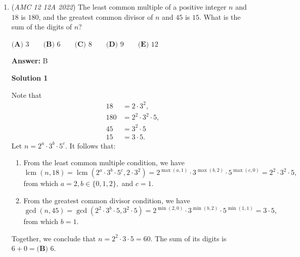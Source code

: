 \begin{enumerate}
 By substitution, we get this list
 \begin{align*} 2&\times 7 \\ 5&\times 6 \\ 2&\times 3 \\ 1&\times 6 \\ \end{align*}
(This also tells us that the diagram is not drawn to scale.)

 Notice how the only dimension not used in the list was $2\times 4$ and that corresponds with B so the answer is, $\boxed{\textbf{(B) }B}.$



	\item (\textit{AMC 12 12A 2022}) The least common multiple of a positive integer $n$ and $18$ is $180$, and the greatest common divisor of $n$ and $45$ is $15$. What is the sum of the digits of $n$?


 $\textbf{(A) } 3 \qquad \textbf{(B) } 6 \qquad \textbf{(C) } 8 \qquad \textbf{(D) } 9 \qquad \textbf{(E) } 12$

 \textbf{Answer: }B



\textbf{Solution 1}

Note that
 \begin{align*} 18 &= 2\cdot3^2, \\ 180 &= 2^2\cdot3^2\cdot5, \\ 45 &= 3^2\cdot5 \\ 15 &= 3\cdot5. \end{align*}
Let $n = 2^a\cdot3^b\cdot5^c.$ It follows that:

 
            \begin{enumerate} 
        \item From the least common multiple condition, we have 
 \[\operatorname{lcm}(n,18) = \operatorname{lcm}(2^a\cdot3^b\cdot5^c,2\cdot3^2) = 2^{\max(a,1)}\cdot3^{\max(b,2)}\cdot5^{\max(c,0)} = 2^2\cdot3^2\cdot5,\] from which $a=2, b\in\{0,1,2\},$ and $c=1.$

        \item From the greatest common divisor condition, we have 
 \[\gcd(n,45) = \gcd(2^2\cdot3^b\cdot5,3^2\cdot5) = 2^{\min(2,0)}\cdot3^{\min(b,2)}\cdot5^{\min(1,1)} = 3\cdot5,\] from which $b=1.$

            \end{enumerate}
            Together, we conclude that $n=2^2\cdot3\cdot5=60.$ The sum of its digits is $6+0=\boxed{\textbf{(B) } 6}.$





\end{enumerate}
